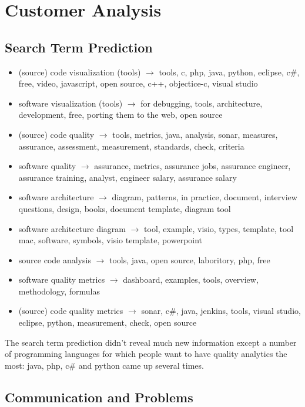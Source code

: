 \documentclass{article}
\begin{document}
\section{Customer Analysis}

\subsection{Search Term Prediction}
\begin{itemize}
	\item (source) code visualization (tools) $\rightarrow$ tools, c, php, java, python, eclipse, c\#, free, video, javascript, open source, c++, objectice-c, visual studio
	\item software visualization (tools) $\rightarrow$ for debugging, tools, architecture, development, free, porting them to the web, open source
	\item (source) code quality $\rightarrow$ tools, metrics, java, analysis, sonar, measures, assurance, assessment, measurement, standards, check, criteria
	\item software quality $\rightarrow$ assurance, metrics, assurance jobs, assurance engineer, assurance training, analyst, engineer salary, assurance salary
	\item software architecture $\rightarrow$ diagram, patterns, in practice, document, interview questions, design, books, document template, diagram tool
	\item software architecture diagram $\rightarrow$ tool, example, visio, types, template, tool mac, software, symbols, visio template, powerpoint
	\item source code analysis $\rightarrow$ tools, java, open source, laboritory, php, free
	\item software quality metrics $\rightarrow$ dashboard, examples, tools, overview, methodology, formulas 
	\item (source) code quality metrics $\rightarrow$ sonar, c\#, java, jenkins, tools, visual studio, eclipse, python, measurement, check, open source
\end{itemize}

The search term prediction didn't reveal much new information except a number of programming languages for which people want to have quality analytics the most: java, php, c\# and python came up several times. 

\subsection{Communication and Problems}
\end{document}
